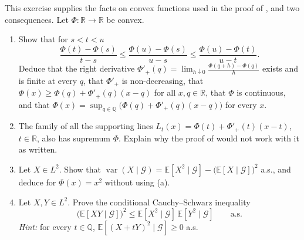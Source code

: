 \begin{exercise}\label{ex:cp-jensen}
\medium This exercise supplies the facts on convex functions used in the proof of
, and two consequences. Let $\Phi:\mathbb R\to\mathbb R$ be convex.
\begin{enumerate}[label=(\alph*)]
  \item Show that for $s<t<u$
    \[
      \frac{\Phi(t)-\Phi(s)}{t-s}\le\frac{\Phi(u)-\Phi(s)}{u-s}\le\frac{\Phi(u)-\Phi(t)}{u-t}.
    \]
    Deduce that the right derivative $\Phi'_+(q)=\lim_{h\downarrow0}\frac{\Phi(q+h)-\Phi(q)}h$
    exists and is finite at every $q$, that $\Phi'_+$ is non-decreasing, that
    $\Phi(x)\ge\Phi(q)+\Phi'_+(q)(x-q)$ for all $x,q\in\mathbb R$, that $\Phi$ is continuous, and that
    $\Phi(x)=\sup_{q\in\mathbb Q}\big(\Phi(q)+\Phi'_+(q)(x-q)\big)$ for every $x$.
  \item The family of all the supporting lines $L_t(x)=\Phi(t)+\Phi'_+(t)(x-t)$, $t\in\mathbb R$,
    also has supremum $\Phi$. Explain why the proof of  would not work with
    it as written.
  \item Let $X\in L^2$. Show that
    $\operatorname{var}(X\mid\mathcal G)=\mathbb E[X^2\mid\mathcal G]-\big(\mathbb E[X\mid\mathcal G]\big)^2$
    a.s., and deduce  for $\Phi(x)=x^2$ without using (a).
  \item Let $X,Y\in L^2$. Prove the conditional Cauchy--Schwarz inequality
    \[
      \big(\mathbb E[XY\mid\mathcal G]\big)^2\le\mathbb E[X^2\mid\mathcal G]\,\mathbb E[Y^2\mid\mathcal G]\qquad\text{a.s.}
    \]
    \emph{Hint:} for every $t\in\mathbb Q$, $\mathbb E[(X+tY)^2\mid\mathcal G]\ge0$ a.s.
\end{enumerate}
\end{exercise}

